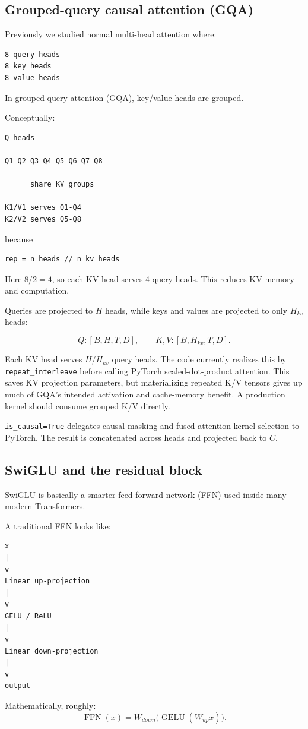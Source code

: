 \subsection{Grouped-query causal attention (GQA)}

Previously we studied normal multi-head attention where:
\begin{lstlisting}[style=shadedpython,language={},basicstyle=\scriptsize\ttfamily]
8 query heads
8 key heads
8 value heads
\end{lstlisting}
In grouped-query attention (GQA), key/value heads are grouped.

Conceptually:
\begin{lstlisting}[style=shadedpython,language={},basicstyle=\scriptsize\ttfamily]
Q heads

Q1 Q2 Q3 Q4 Q5 Q6 Q7 Q8

      share KV groups

K1/V1 serves Q1-Q4
K2/V2 serves Q5-Q8
\end{lstlisting}
because
\begin{lstlisting}[style=shadedpython]
rep = n_heads // n_kv_heads
\end{lstlisting}
Here \(8/2=4\), so each KV head serves 4 query heads. This reduces KV memory
and computation.

Queries are projected to \(H\) heads, while keys and values are projected to
only \(H_{kv}\) heads:

\[
  Q:[B,H,T,D],\qquad
  K,V:[B,H_{kv},T,D].
\]

Each KV head serves \(H/H_{kv}\) query heads. The code currently realizes this
by \texttt{repeat\_interleave} before calling PyTorch scaled-dot-product
attention. This saves KV projection parameters, but materializing repeated K/V
tensors gives up much of GQA's intended activation and cache-memory benefit.
A production kernel should consume grouped K/V directly.

\texttt{is\_causal=True} delegates causal masking and fused attention-kernel
selection to PyTorch. The result is concatenated across heads and projected
back to \(C\).

\subsection{SwiGLU and the residual block}

SwiGLU is basically a smarter feed-forward network (FFN) used inside
many modern Transformers.

A traditional FFN looks like:
\begin{lstlisting}[style=shadedpython,language={},basicstyle=\scriptsize\ttfamily]
x
|
v
Linear up-projection
|
v
GELU / ReLU
|
v
Linear down-projection
|
v
output
\end{lstlisting}
Mathematically, roughly:
\[
  \operatorname{FFN}(x)=W_{down}\bigl(\operatorname{GELU}(W_{up}x)\bigr).
\]

